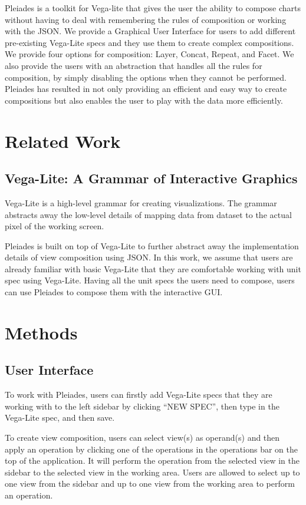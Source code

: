 \documentclass[journal]{vgtc}                %
\begin{document}
Pleiades is a toolkit for Vega-lite that gives the user the ability to compose
charts without having to deal with remembering the rules of composition or working
with the JSON. We provide a Graphical User Interface for users to add different
pre-existing Vega-Lite specs and they use them to create complex compositions.
We provide four options for composition: Layer, Concat, Repeat, and Facet. We also
provide the users with an abstraction that handles all the rules for composition,
by simply disabling the options when they cannot be performed. Pleiades has resulted
in not only providing an efficient and easy way to create compositions but also
enables the user to play with the data more efficiently.

\section{Related Work}

\subsection{Vega-Lite: A Grammar of Interactive Graphics}
Vega-Lite is a high-level grammar for creating visualizations. The grammar abstracts
away the low-level details of mapping data from dataset to the actual pixel of the
working screen.

Pleiades is built on top of Vega-Lite to further abstract away the implementation
details of view composition using JSON. In this work, we assume that users are
already familiar with basic Vega-Lite that they are comfortable working with unit
spec using Vega-Lite. Having all the unit specs the users need to compose, users
can use Pleiades to compose them with the interactive GUI.


\section{Methods}
\subsection{User Interface}

To work with Pleiades, users can firstly add Vega-Lite specs that they are working
with to the left sidebar by clicking ``NEW SPEC'', then type in the Vega-Lite spec,
and then save.

To create view composition, users can select view(s) as operand(s) and then apply
an operation by clicking one of the operations in the operations bar on the top of
the application. It will perform the operation from the selected view in the sidebar
to the selected view in the working area. Users are allowed to select up to one view
from the sidebar and up to one view from the working area to perform an operation.
\end{document}
